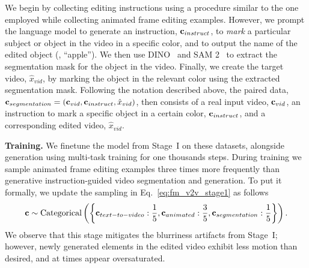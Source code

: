We begin by collecting editing instructions using a procedure similar to the one employed while collecting animated frame editing examples.
However, we prompt the language model to generate an instruction, $\mathbf{c}_{instruct}$, to \textit{mark} a particular subject or object in the video in a specific color, and to output the name of the edited object (\eg, ``apple'').
We then use DINO~\citep{groundingdino} and SAM 2~\citep{ravi2024sam2} to extract the segmentation mask for the object in the video.
Finally, we create the target video, $\hat{x}_{vid}$, by marking the object in the relevant color using the extracted segmentation mask.
Following the notation described above, the paired data, $\mathbf{c}_{segmentation}=(\mathbf{c}_{vid}, \mathbf{c}_{instruct}, \hat{x}_{vid})$, then consists of a real input video, $\mathbf{c}_{vid}$, an instruction to mark a specific object in a certain color, $\mathbf{c}_{instruct}$, and a corresponding edited video, $\hat{x}_{vid}$.

\textbf{Training.}
We finetune the model from Stage~I on these datasets, alongside \textToV generation using multi-task training for one thousands steps.
During training we sample animated frame editing examples three times more frequently than generative instruction-guided video segmentation and \textToV generation.
To put it formally, we update the sampling in Eq.~\ref{eq:fm_v2v_stage1} as follows
\begin{equation}
\label{eq:fm_v2v_stage2}
\mathbf{c} \sim \text{Categorical}\left( \left\{ \mathbf{c}_{text-to-video}: \frac{1}{5}, \mathbf{c}_{animated}: \frac{3}{5}, \mathbf{c}_{segmentation}: \frac{1}{5} \right\} \right).
\end{equation}
We observe that this stage mitigates the blurriness artifacts from Stage~I; however, newly generated elements in the edited video exhibit less motion than desired, and at times appear oversaturated.

